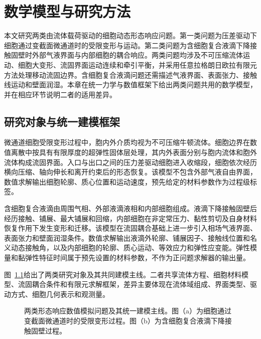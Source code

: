 \chapter{数学模型与研究方法}
\label{cha:chap02}

本文研究两类由流体载荷驱动的细胞动态形态响应问题。第一类问题为压差驱动下细胞通过变截面微通道时的受限变形与运动。第二类问题为含细胞复合液滴下降接触固壁时外部气液界面与内部细胞的耦合响应。两类问题均涉及不可压缩流体运动、细胞大变形、流固界面运动连续和牵引平衡，并采用任意拉格朗日欧拉有限元方法处理移动流固边界。含细胞复合液滴问题还需描述气液界面、表面张力、接触线运动和壁面润湿。本章在统一力学与数值框架下给出两类问题共用的数学模型，并在相应环节说明二者的适用差异。

\section{研究对象与统一建模框架}

微通道细胞受限变形过程中，胞内外介质均视为不可压缩牛顿流体。细胞边界在数值离散中按具有有限厚度的超弹性固体层处理，其内外表面分别与胞内流体和胞外流体构成流固界面。入口与出口之间的压力差驱动细胞进入收缩段，细胞依次经历横向压缩、轴向伸长和离开约束后的形态恢复。该模型不包含外部气液自由界面，数值求解输出细胞轮廓、质心位置和运动速度，预先给定的材料参数作为过程级标签。

含细胞复合液滴由周围气相、外部液滴液相和内部细胞组成。液滴下降接触固壁后经历接触、铺展、最大铺展和回缩，内部细胞在非定常压力、黏性剪切及自身材料恢复作用下发生变形和迁移。该模型在流固耦合基础上进一步引入相场气液界面、表面张力和壁面润湿条件。数值求解输出液滴外轮廓、铺展因子、接触线位置和名义动态接触角，以及内部细胞的轮廓、质心运动、等效应力和弹性应变能。弹性模量和黏弹性特征时间属于预先设置的材料参数，不作为正问题求解器的输出量。

图~\ref{fig:ch2_two_models}给出了两类研究对象及其共同建模主线。二者共享流体方程、细胞材料模型、流固耦合条件和有限元求解框架，差异主要体现在流体域组成、界面类型、驱动方式、细胞几何表示和观测量。

\begin{figure}[htbp]
  \centering
  
  \caption{两类形态响应数值模拟问题及其统一建模主线。图（a）为细胞通过变截面微通道时的受限变形过程。图（b）为含细胞复合液滴下降接触固壁过程。}
  \label{fig:ch2_two_models}
\end{figure}

